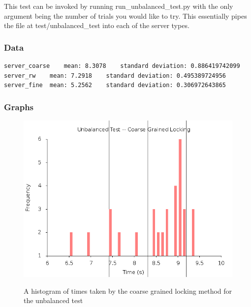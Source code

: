 \documentclass[paper=a4, fontsize=11pt]{scrartcl} %
\numberwithin{equation}{section} %
\numberwithin{figure}{section} %
\numberwithin{table}{section} %
\begin{document}
This test can be invoked by running run\_unbalanced\_test.py with the only argument being the number of trials you would like to try.  This essentially pipes the file at test/unbalanced\_test into each of the server types.

\subsubsection{Data}
\begin{verbatim}
server_coarse	 mean: 8.3078	 standard deviation: 0.886419742099
server_rw	 mean: 7.2918	 standard deviation: 0.495389724956
server_fine	 mean: 5.2562	 standard deviation: 0.306972643865
\end{verbatim}

\subsubsection{Graphs}
\begin{figure}[h]
  \caption{A histogram of times taken by the coarse grained locking method for the unbalanced test} 
  \centering
  \includegraphics[width=\textwidth]{unbalanced_server_coarse_final.png}
  \label{fig:unbal_coarse}
\end{figure}
\end{document}
